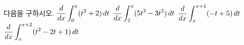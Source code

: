 다음을 구하시오.
 $\dfrac{d}{dx}\displaystyle\int_{0}^{x}(t^2+2)\mkern3mu dt$
 $\dfrac{d}{dx}\displaystyle\int_{2}^{x}(5t^3-3t^2)\mkern3mu dt$
 $\dfrac{d}{dx}\displaystyle\int_{x}^{x+1}(-t+5)\mkern3mu dt$
 $\dfrac{d}{dx}\displaystyle\int_{x}^{x+2}(t^2-2t+1)\mkern3mu dt$
